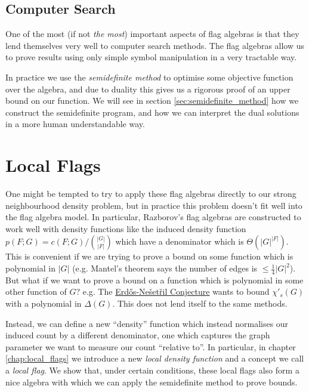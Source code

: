 \subsection*{Computer Search}

One of the most (if not \textit{the most}) important aspects of flag algebras is that
they lend themselves very well to computer search methods.
The flag algebras allow us to prove results using only simple symbol manipulation in a very
tractable way.

In practice we use the \textit{semidefinite method} to optimise some objective function
over the algebra, and due to duality this gives us a rigorous proof of an upper bound on our
function.
We will see in section \ref{sec:semidefinite_method} how we construct the semidefinite program,
and how we can interpret the dual solutions in a more human understandable way.

\section*{Local Flags}

One might be tempted to try to apply these flag algebras directly to our strong neighbourhood
density problem, but in practice this problem doesn't fit well into the flag algebra model.
In particular, Razborov's flag algebras are constructed to work well with density functions
like the induced density function $p(F; G) = c(F; G)/\binom{|G|}{|F|}$ which have a
denominator which is $\Theta(|G|^{|F|})$. This is convenient if we are trying to prove
a bound on some function which is polynomial in $|G|$
(e.g. Mantel's theorem says the number of edges is $\leq \frac{1}{4}|G|^2$). But what if
we want to prove a bound on a function which is polynomial in some other function
of $G$? e.g. The \hyperref[conj:intro_erdos_nesetril]{Erd\H{o}s-Nešetřil Conjecture}
wants to bound $\chi'_s(G)$ with a polynomial in $\Delta(G).$ This does not lend itself
to the same methods.

Instead, we can define a new ``density'' function which instead normalises our induced
count by a different denominator, one which captures the graph parameter we want to measure
our count ``relative to''. In particular, in chapter \ref{chap:local_flags} we introduce a
new \textit{local density function} and a concept we call a \textit{local flag}.
We show that, under certain conditions, these local flags also form a nice algebra
with which we can apply the semidefinite method to prove bounds.

